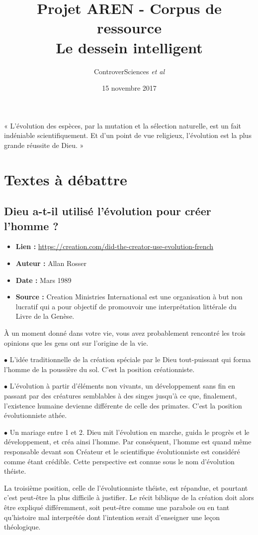 \documentclass[8pt]{article}
\author{ControverSciences\textit{ et al} }
\title{Projet AREN - Corpus de ressource \\ Le dessein intelligent}
\date{15 novembre 2017}
\begin{document}
\maketitle
« L'évolution des espèces, par la mutation et la sélection naturelle, est un fait indéniable scientifiquement. Et d'un point de vue religieux, l'évolution est la plus grande réussite de Dieu. »
\tableofcontents
\newpage
\section{Textes à débattre}
\subsection{Dieu a-t-il utilisé l’évolution pour créer l’homme ?}
\begin{itemize}
	\item \textbf{Lien : }  \url{https://creation.com/did-the-creator-use-evolution-french} 
	\item \textbf{Auteur : } Allan Rosser
	\item \textbf{Date : } Mars 1989
	\item \textbf{Source : } Creation Ministries International est une organisation à but non lucratif qui a pour objectif de promouvoir une interprétation littérale du Livre de la Genèse.
\end{itemize}

 À un moment donné dans votre vie, vous avez probablement rencontré les trois opinions que les gens ont sur l’origine de la vie.

	$\bullet$ L’idée traditionnelle de la création spéciale par le Dieu tout-puissant qui forma l’homme de la poussière du sol. C’est la position créationniste.

	$\bullet$ L’évolution à partir d’éléments non vivants, un développement sans fin en passant par des créatures semblables à des singes jusqu’à ce que, finalement, l’existence humaine devienne différente de celle des primates. C’est la position évolutionniste athée.

	$\bullet$ Un mariage entre 1 et 2. Dieu mit l’évolution en marche, guida le progrès et le développement, et créa ainsi l’homme. Par conséquent, l’homme est quand même responsable devant son Créateur et le scientifique évolutionniste est considéré comme étant crédible. Cette perspective est connue sous le nom d’évolution théiste.

La troisième position, celle de l’évolutionniste théiste, est répandue, et pourtant c’est peut-être la plus difficile à justifier. Le récit biblique de la création doit alors être expliqué différemment, soit peut-être comme une parabole ou en tant qu’histoire mal interprétée dont l’intention serait d’enseigner une leçon théologique.
\end{document}
